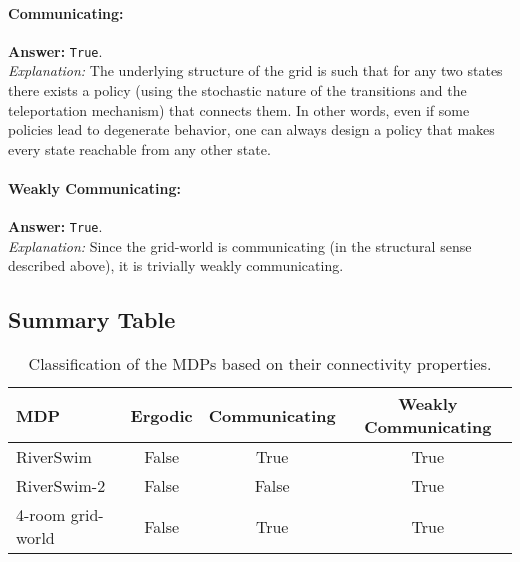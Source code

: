 \paragraph{Communicating:}  
\textbf{Answer:} \texttt{True}.\\[0.5em]
\textit{Explanation:}  
The underlying structure of the grid is such that for any two states there exists a policy (using the stochastic nature of the transitions and the teleportation mechanism) that connects them. In other words, even if some policies lead to degenerate behavior, one can always design a policy that makes every state reachable from any other state.

\paragraph{Weakly Communicating:}  
\textbf{Answer:} \texttt{True}.\\[0.5em]
\textit{Explanation:}  
Since the grid-world is communicating (in the structural sense described above), it is trivially weakly communicating.

\medskip

\subsection*{Summary Table}

\begin{table}[h]
\centering
\begin{tabular}{lccc}
\toprule
\textbf{MDP}              & \textbf{Ergodic} & \textbf{Communicating} & \textbf{Weakly Communicating} \\
\midrule
RiverSwim                & False          & True                & True \\
RiverSwim-2              & False          & False               & True \\
4-room grid-world        & False          & True                & True \\
\bottomrule
\end{tabular}
\caption{Classification of the MDPs based on their connectivity properties.}
\label{tab:mdp_classes}
\end{table}